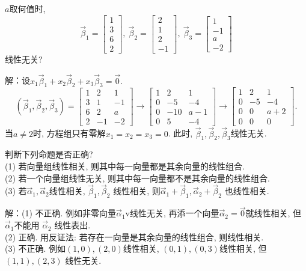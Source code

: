 \begin{eg}
$a$取何值时, $$\vec{\beta}_1=\begin{bmatrix}1\\3\\6\\2\end{bmatrix},\  \vec{\beta}_2=\begin{bmatrix}2\\1\\2\\-1\end{bmatrix},\
\vec{\beta}_3=\begin{bmatrix}1\\-1\\a\\-2\end{bmatrix}$$线性无关?
\end{eg}
解：设$x_1\vec{\beta}_1+x_2\vec{\beta}_2+x_3\vec{\beta}_3=\vec{0}.$
\begin{displaymath}
(\vec{\beta}_1,\vec{\beta}_2,\vec{\beta}_3)=\begin{bmatrix}1&2&1\\3&1&-1\\6&2&
a\\2&-1&-2\end{bmatrix}\rightarrow\begin{bmatrix}1&2&1\\0&-5&-4\\0&-10&a-1\\0&5 &-4\end{bmatrix}\rightarrow\begin{bmatrix}1&2&1\\0&-5&-4\\0&0&a+2\\0&0&0\end{bmatrix}.
\end{displaymath}
当$a\not=2$时, 方程组只有零解$x_1=x_2=x_3=0$. 此时, $\vec{\beta}_1,\vec{\beta}_2,\vec{\beta}_3$线性无关.

\begin{eg}
判断下列命题是否正确?\\
(1) 若向量组线性相关, 则其中每一向量都是其余向量的线性组合.\\
(2) 若一个向量组线性无关,  则其中每一向量都不是其余向量的线性组合.\\
(3) 若$\vec{\alpha}_1,\vec{\alpha}_2$线性相关, $\vec{\beta}_1,\vec{\beta}_2$ 线性相关, 则$\vec{\alpha}_1+\vec{\beta}_1, \vec{\alpha}_2+\vec{\beta}_2$ 也线性相关.
\end{eg}
解：(1) 不正确. 例如非零向量$\vec{\alpha}_1$v线性无关, 再添一个向量$\vec{\alpha}_2=\vec{0}$就线性相关, 但$\vec{\alpha}_1$不能用 $\vec{\alpha}_2$ 线性表出.\\
(2) 正确. 用反证法: 若存在一向量是其余向量的线性组合,  则线性相关.\\
(3) 不正确. 例如$(1,0),(2,0)$线性相关, $(0,1),(0,3)$线性相关, 但$(1,1),(2,3)$ 线性无关.

